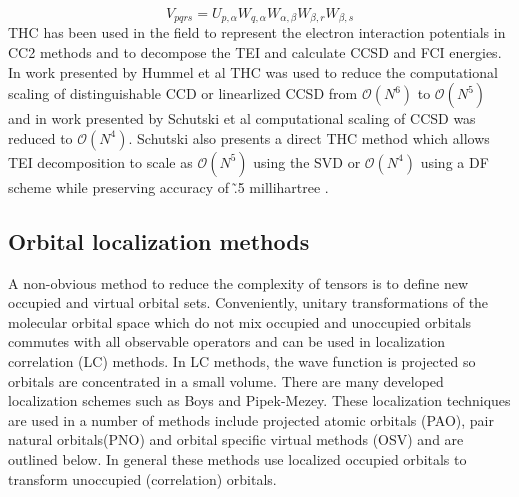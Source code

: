 			\begin{equation}
				V_{pqrs} = U_{p, \alpha} W_{q, \alpha} W_{\alpha, \beta} W_{\beta, r} W_{\beta, s}
			\end{equation}
		THC has been used in the field to represent the electron interaction potentials in CC2 methods and to decompose the TEI and calculate CCSD and FCI energies. In work presented by Hummel et al \cite{Hummel} THC was used to reduce the computational scaling of distinguishable CCD or linearlized CCSD from $\mathcal{O}(N^6)$ to $\mathcal{O}(N^5)$ and in work presented by Schutski et al\cite{Schutski} computational scaling of CCSD was reduced to $\mathcal{O}(N^4)$.  Schutski also presents a direct THC method which allows TEI decomposition to scale as $\mathcal{O}(N^5)$ using the SVD or $\mathcal{O}(N^4)$ using a DF scheme while preserving accuracy of \~.5 millihartree .
	\subsection{Orbital localization methods}
		A non-obvious method to reduce the complexity of tensors is to define new occupied and virtual orbital sets. Conveniently, unitary transformations of the molecular orbital space which do not mix occupied and unoccupied orbitals commutes with all observable operators\cite{SzaboAttila1982} and can be used in localization correlation (LC) methods.  
		In LC methods, the wave function is projected so orbitals are concentrated in a small volume.  There are many developed localization schemes such as Boys and Pipek-Mezey\cite{Boughton1993}.  These localization techniques are used in a number of methods include projected atomic orbitals (PAO), pair natural orbitals(PNO) and orbital specific virtual methods (OSV) and are outlined below.  In general these methods use localized occupied orbitals to transform unoccupied (correlation) orbitals.

